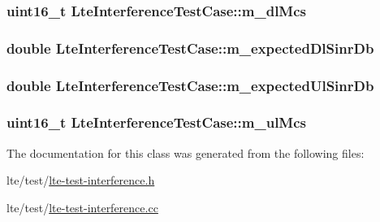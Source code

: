 \subsubsection[{\texorpdfstring{m\+\_\+dl\+Mcs}{m_dlMcs}}]{\setlength{\rightskip}{0pt plus 5cm}uint16\+\_\+t Lte\+Interference\+Test\+Case\+::m\+\_\+dl\+Mcs\hspace{0.3cm}{\ttfamily [private]}}\hypertarget{classLteInterferenceTestCase_a30cae7c88e7a397b7e0f5391f25d165a}{}\label{classLteInterferenceTestCase_a30cae7c88e7a397b7e0f5391f25d165a}
\subsubsection[{\texorpdfstring{m\+\_\+expected\+Dl\+Sinr\+Db}{m_expectedDlSinrDb}}]{\setlength{\rightskip}{0pt plus 5cm}double Lte\+Interference\+Test\+Case\+::m\+\_\+expected\+Dl\+Sinr\+Db\hspace{0.3cm}{\ttfamily [private]}}\hypertarget{classLteInterferenceTestCase_a2524e1bc84780c6e3df394e9650d9e10}{}\label{classLteInterferenceTestCase_a2524e1bc84780c6e3df394e9650d9e10}
\subsubsection[{\texorpdfstring{m\+\_\+expected\+Ul\+Sinr\+Db}{m_expectedUlSinrDb}}]{\setlength{\rightskip}{0pt plus 5cm}double Lte\+Interference\+Test\+Case\+::m\+\_\+expected\+Ul\+Sinr\+Db\hspace{0.3cm}{\ttfamily [private]}}\hypertarget{classLteInterferenceTestCase_a5aa9fa527027dc6d168e72f7b2b3f8a8}{}\label{classLteInterferenceTestCase_a5aa9fa527027dc6d168e72f7b2b3f8a8}
\subsubsection[{\texorpdfstring{m\+\_\+ul\+Mcs}{m_ulMcs}}]{\setlength{\rightskip}{0pt plus 5cm}uint16\+\_\+t Lte\+Interference\+Test\+Case\+::m\+\_\+ul\+Mcs\hspace{0.3cm}{\ttfamily [private]}}\hypertarget{classLteInterferenceTestCase_ae9b735d97696042105ca16ad0bf9b6fd}{}\label{classLteInterferenceTestCase_ae9b735d97696042105ca16ad0bf9b6fd}


The documentation for this class was generated from the following files\+:\begin{DoxyCompactItemize}
\item 
lte/test/\hyperlink{lte-test-interference_8h}{lte-\/test-\/interference.\+h}\item 
lte/test/\hyperlink{lte-test-interference_8cc}{lte-\/test-\/interference.\+cc}\end{DoxyCompactItemize}

